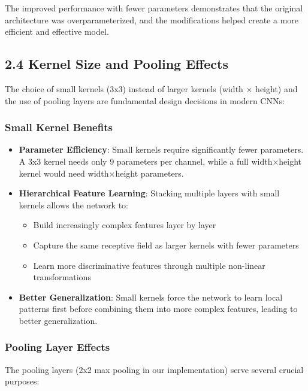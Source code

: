 The improved performance with fewer parameters demonstrates that the original architecture was overparameterized, and the modifications helped create a more efficient and effective model.

\subsection{2.4 Kernel Size and Pooling Effects}

The choice of small kernels (3x3) instead of larger kernels (width × height) and the use of pooling layers are fundamental design decisions in modern CNNs:

\subsubsection{Small Kernel Benefits}
\begin{itemize}
    \item \textbf{Parameter Efficiency}: Small kernels require significantly fewer parameters. A 3x3 kernel needs only 9 parameters per channel, while a full width×height kernel would need width×height parameters.
    
    \item \textbf{Hierarchical Feature Learning}: Stacking multiple layers with small kernels allows the network to:
    \begin{itemize}
        \item Build increasingly complex features layer by layer
        \item Capture the same receptive field as larger kernels with fewer parameters
        \item Learn more discriminative features through multiple non-linear transformations
    \end{itemize}
    
    \item \textbf{Better Generalization}: Small kernels force the network to learn local patterns first before combining them into more complex features, leading to better generalization.
\end{itemize}

\subsubsection{Pooling Layer Effects}
The pooling layers (2x2 max pooling in our implementation) serve several crucial purposes:

